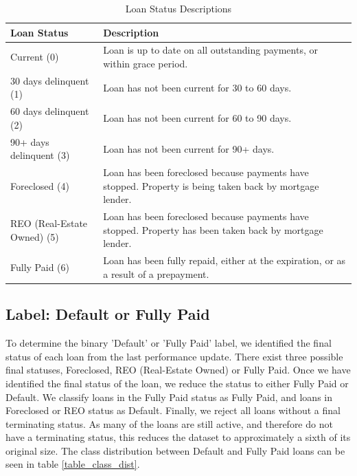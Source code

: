         \begin{table}[H]
            \centering
                \begin{tabular}{|p{5cm}|p{9cm}|}
    
                    \hline \textbf{Loan Status} & \textbf{Description} \\ \hline \hline
                    Current (0)            & Loan is up to date on all outstanding payments, or within grace period. \\ \hline
                    30 days delinquent (1) & Loan has not been current for 30 to 60 days. \\ \hline
                    60 days delinquent (2) & Loan has not been current for 60 to 90 days. \\ \hline
                    90+ days delinquent (3) & Loan has not been current for 90+ days. \\ \hline
                    Foreclosed (4) & Loan has been foreclosed because payments have stopped. Property is being taken back by mortgage lender. \\ \hline
                    REO (Real-Estate Owned) (5)  & Loan has been foreclosed because payments have stopped. Property has been taken back by mortgage lender. \\ \hline
                    Fully Paid (6)  & Loan has been fully repaid, either at the expiration, or as a result of a prepayment. \\ \hline
                    \end{tabular}
                \caption{Loan Status Descriptions}
                \label{appendix: table_american_loan_labels}
        \end{table}

        
        \subsection{Label: Default or Fully Paid}  \label{labeling}
            To determine the binary 'Default' or 'Fully Paid' label, we identified the final status of each loan from the last performance update. There exist three possible final statuses, Foreclosed, REO (Real-Estate Owned) or Fully Paid. Once we have identified the final status of the loan, we reduce the status to either Fully Paid or Default. We classify loans in the Fully Paid status as Fully Paid, and loans in Foreclosed or REO status as Default. Finally, we reject all loans without a final terminating status. As many of the loans are still active, and therefore do not have a terminating status, this reduces the dataset to approximately a sixth of its original size. The class distribution between Default and Fully Paid loans can be seen in table \ref{table_class_dist}.  
            
